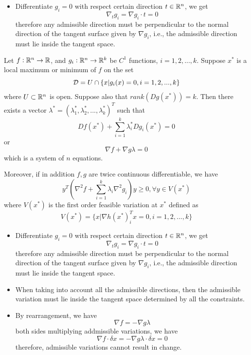 \begin{refsection}
\begin{remark}\hfill
\begin{itemize}
    \item Differentiate $ g_i = 0$ with respect certain direction $t\in \mathbb{R}^n$, we get
$$\nabla_t g_i = \nabla g_i \cdot t = 0$$
therefore any admissible direction must be perpendicular to the normal direction of the tangent surface given by $\nabla g_i$, i.e., the admissible direction must lie inside the tangent space. 
\end{itemize}
\end{remark}

\begin{theorem}\cite[114]{sundaram1996first}\cite[347]{bertsekas2016nonlinear} Let $f:\mathbb{R}^n\to \mathbb{R}$, and $g_i: \mathbb{R}^n\to \mathbb{R}^k$ be $C^1$ functions, $i=1,2,...,k$. Suppose $x^*$ is a local maximum or minimum of $f$ on the set 
$$\mathcal{D} = U\cap \{x|g_i(x)=0,i=1,2,...,k\}$$
where $U\subset \mathbb{R}^n$ is open. Suppose also that $rank(Dg(x^*)) = k$. Then there exists a vector $\lambda^*=(\lambda^*_1,\lambda^*_2,...,\lambda^*_k)^T$ such that 
$$Df(x^*) + \sum_{i=1}^k \lambda^*_i Dg_i(x^*) = 0$$ or
$$\nabla f + \nabla g \lambda = 0$$
which is a system of $n$ equations.

Moreover, if in addition $f,g$ are twice continuous differentiable, we have
$$y^T(\nabla^2 f + \sum_{i=1}^k\lambda_i \nabla^2 g_i )y \geq 0, \forall y \in V(x^*)$$
where $V(x^*)$ is the first order feasible variation at $x^*$ defined as
$$V(x^*) = \{x | \nabla h(x^*)_i^Tx = 0,i=1,2,...,k \}$$
\end{theorem}

\begin{remark}\hfill
\begin{itemize}
    \item Differentiate $ g_i = 0$ with respect certain direction $t\in \mathbb{R}^n$, we get
$$\nabla_t g_i = \nabla g_i \cdot t = 0$$
therefore any admissible direction must be perpendicular to the normal direction of the tangent surface given by $\nabla g_i$, i.e., the admissible direction must lie inside the tangent space. 
\item When taking into account all the admissible directions, then the admissible variation must lie inside the tangent space determined by all the constraints. 
\item By rearrangement, we have 
$$\nabla f = -\nabla g \lambda$$
both sides multiplying addmissible variations, we have $$\nabla f \cdot \delta x = -\nabla g \lambda \cdot \delta x = 0$$
therefore, admissible variations cannot result in change. 
\end{itemize}
\end{remark}



\end{refsection}
